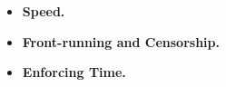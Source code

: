 \begin{itemize}

\item \textbf{Speed.}

\item \textbf{Front-running and Censorship.}

\item \textbf{Enforcing Time.}

\end{itemize}















